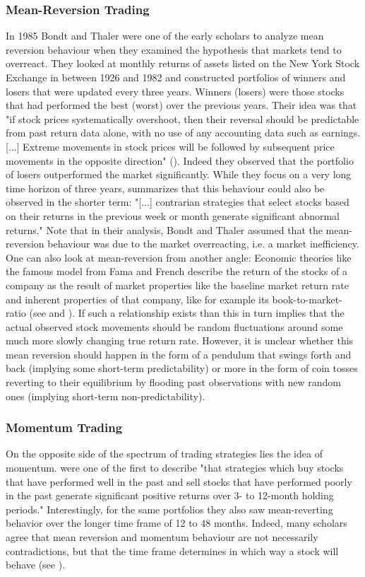 \subsubsection{Mean-Reversion Trading}
In 1985 Bondt and Thaler \citet{bondt_does_1985} were one of the early scholars to analyze mean reversion behaviour when they examined the hypothesis that markets tend to overreact. They looked at monthly returns of assets listed on the New York Stock Exchange in between 1926 and 1982 and constructed portfolios  of winners and losers that were updated every three years. Winners (losers) were those stocks that had performed the best (worst) over the previous years. Their idea was that "if stock prices systematically overshoot, then their reversal should be predictable from past return data alone, with no use of any accounting data such as earnings. [...] Extreme movements in stock prices will be followed by subsequent price movements in the opposite direction" (\cite{bondt_does_1985}). Indeed they observed that the portfolio of losers outperformed the market significantly. While they focus on a very long time horizon of three years, \citep{jegadeesh_returns_1993} summarizes that this behaviour could also be observed in the shorter term: "[...] contrarian strategies that select stocks based on their returns in the previous week or month generate significant abnormal returns." Note that in their analysis, Bondt and Thaler assumed that the mean-reversion behaviour was due to the market overreacting, i.e. a market inefficiency. One can also look at mean-reversion from another angle: Economic theories like the famous model from Fama and French describe the return of the stocks of a company as the result of market properties like the baseline market return rate and inherent properties of that company, like for example its book-to-market-ratio  (see \citet{fama_cross-section_1992} and \citet{fama_common_1993}). If such a relationship exists than this in turn implies that the actual observed stock movements should be random fluctuations around some much more slowly changing true return rate. However, it is unclear whether this mean reversion should happen in the form of a pendulum that swings forth and back (implying some short-term predictability) or more in the form of coin tosses reverting to their equilibrium by flooding past observations with new random ones (implying short-term non-predictability). 

\subsubsection{Momentum Trading}
On the opposite side of the spectrum of trading strategies lies the idea of momentum. \cite{jegadeesh_returns_1993} were one of the first to describe "that strategies which buy stocks that have performed well in the past and sell stocks that have performed poorly in the past generate significant positive returns over 3- to 12-month holding periods."   Interestingly, for the same portfolios they also saw mean-reverting behavior over the longer time frame of 12 to 48 months. Indeed, many scholars agree that mean reversion and momentum behaviour are not necessarily contradictions, but that the time frame determines in which way a stock will behave (see \cite{balvers_momentum_2006}). 

